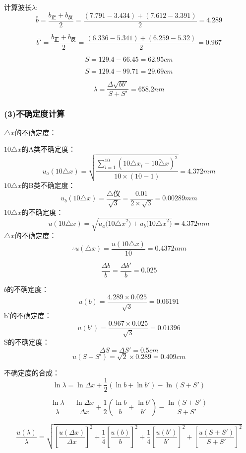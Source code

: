 \documentclass[11pt,a4paper,oneside]{article}
\begin{document}
计算波长$\lambda$:
$$\bar{b} = \displaystyle\frac{b_\text{正}+b_\text{反}}{2} = \displaystyle\frac{ (7.791-3.434)+(7.612-3.391)}{2} = 4.289$$

$$\bar{b'} = \displaystyle\frac{b_\text{正}+b_\text{反}}{2} = \displaystyle\frac{ (6.336-5.341)+(6.259-5.32)}{2} = 0.967$$

$$ S = 129.4 - 66.45 = 62.95cm$$

$$ S = 129.4 - 99.71 = 29.69cm$$

$$ {\lambda} = \displaystyle\frac{{\Delta}\sqrt{bb'}}{S+S'} = 658.2nm$$

\subsubsection*{(3)不确定度计算}
${\triangle}x$的不确定度：

$10{\triangle}x$的A类不确定度：
$$u_a(10{\triangle}x) = \sqrt{\displaystyle\frac{\sum\limits_{i=1}^{10} (10{{\triangle}x}_i-\bar{10{\triangle}x})^2}{10{\times}(10-1)}} = 4.372mm$$
$10{\triangle}x$的B类不确定度：
$$u_b({10{\triangle}x})=\displaystyle\frac{\bigtriangleup\text{仪}}{\sqrt{3}}
= \frac{0.01}{2{\times}\sqrt{3}} = 0.00289mm$$
$10{\triangle}x$的不确定度：
$$u(10{\triangle}x)=\sqrt{{u_a(10{\triangle}x}^2)+{u_b(10{\triangle}x}^2)} = 4.372mm$$
${\triangle}x$的不确定度：
$${\therefore}u({\triangle}x) = \displaystyle\frac{u(10{\triangle}x)}{10} = 0.4372mm$$

$$ \displaystyle\frac{{\Delta}b}{b} = \displaystyle\frac{{\Delta}b'}{b} = 0.025 $$

$b$的不确定度：
$$ u(b) = \displaystyle\frac{ 4.289{\times}0.025}{\sqrt{3}} =0.06191 $$
b'的不确定度：
$$ u(b') = \displaystyle\frac{ 0.967{\times}0.025}{\sqrt{3}} =0.01396 $$
S的不确定度：
$${\Delta}S = {\Delta}S' = 0.5cm$$
$$ u(S+S') = \sqrt{2} {\times} 0.289 = 0.409cm$$

不确定度的合成：
$$ \ln{\lambda} = \ln{{\Delta}x}+ \displaystyle\frac{1}{2}(\ln{b}+\ln{b'}) - \ln(S+S')$$

$$\displaystyle\frac{\ln{\lambda}}{\lambda} = \displaystyle\frac{\ln{\Delta}x}{{\Delta}x}+\displaystyle\frac{1}{2}(\displaystyle\frac{\ln{b}}{b}+\displaystyle\frac{\ln{b'}}{b'}) - \displaystyle\frac{\ln{(S+S')}}{S+S'}$$

$$\displaystyle\frac{u({\lambda})}{\lambda} = \sqrt{ [{\frac{u({\Delta}x)}{{\Delta}x}}]^2+\frac{1}{4}[{\frac{u(b)}{b}}]^2 +\frac{1}{4}[{\frac{u(b')}{b'}}]^2 + [\frac{u(S+S')}{S+S'}]^2   }  $$
\end{document}

